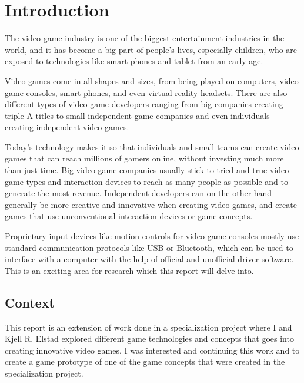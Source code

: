 \chapter{Introduction}
The video game industry is one of the biggest entertainment industries in the world, and it has become a big part of people's lives, especially children, who are exposed to technologies like smart phones and tablet from an early age. 

Video games come in all shapes and sizes, from being played on computers, video game consoles, smart phones, and even virtual reality headsets. There are also different types of video game developers ranging from big companies creating triple-A titles to small independent game companies and even individuals creating independent video games. 

Today's technology makes it so that individuals and small teams can create video games that can reach millions of gamers online, without investing much more than just time. Big video game companies usually stick to tried and true video game types and interaction devices to reach as many people as possible and to generate the most revenue. Independent developers can on the other hand generally be more creative and innovative when creating video games, and create games that use unconventional interaction devices or game concepts.

Proprietary input devices like motion controls for video game consoles mostly use standard communication protocols like USB or Bluetooth, which can be used to interface with a computer with the help of official and unofficial driver software. This is an exciting area for research which this report will delve into.


\section{Context}
This report is an extension of work done in a specialization project where I and Kjell R. Elstad explored different game technologies and concepts that goes into creating innovative video games. I was interested and continuing this work and to create a game prototype of one of the game concepts that were created in the specialization project.


